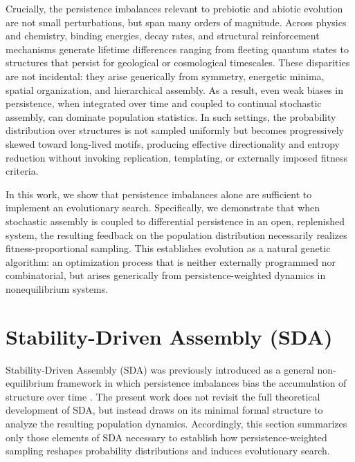 \documentclass{artificial-life}
\let\cite\citep
\begin{document}
Crucially, the persistence imbalances relevant to prebiotic and abiotic evolution are not small perturbations, but span many orders of magnitude. Across physics and chemistry, binding energies, decay rates, and structural reinforcement mechanisms generate lifetime differences ranging from fleeting quantum states to structures that persist for geological or cosmological timescales. These disparities are not incidental: they arise generically from symmetry, energetic minima, spatial organization, and hierarchical assembly. As a result, even weak biases in persistence, when integrated over time and coupled to continual stochastic assembly, can dominate population statistics. In such settings, the probability distribution over structures is not sampled uniformly but becomes progressively skewed toward long-lived motifs, producing effective directionality and entropy reduction without invoking replication, templating, or externally imposed fitness criteria.

In this work, we show that persistence imbalances alone are sufficient to implement an evolutionary search. Specifically, we demonstrate that when stochastic assembly is coupled to differential persistence in an open, replenished system, the resulting feedback on the population distribution necessarily realizes fitness-proportional sampling. This establishes evolution as a natural genetic algorithm: an optimization process that is neither externally programmed nor combinatorial, but arises generically from persistence-weighted dynamics in nonequilibrium systems.

\section{Stability-Driven Assembly (SDA)}

Stability-Driven Assembly (SDA) was previously introduced \cite{adler_sda} as a general non-equilibrium framework in which persistence imbalances bias the accumulation of structure over time . The present work does not revisit the full theoretical development of SDA, but instead draws on its minimal formal structure to analyze the resulting population dynamics. Accordingly, this section summarizes only those elements of SDA necessary to establish how persistence-weighted sampling reshapes probability distributions and induces evolutionary search.
\end{document}
